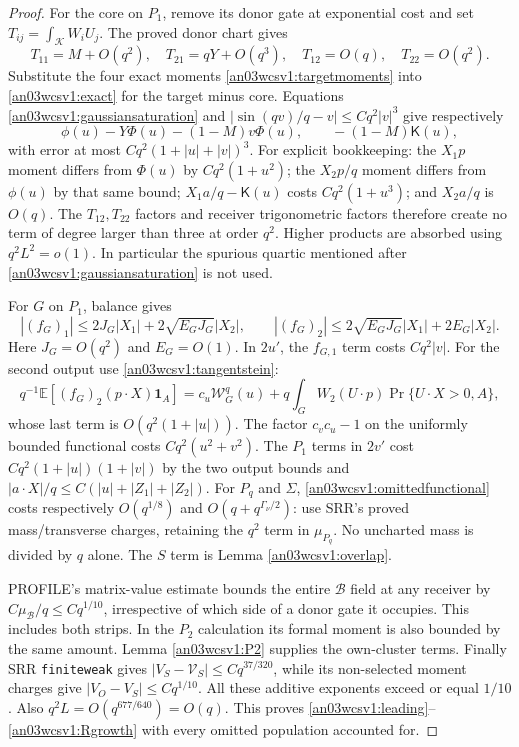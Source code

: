 \documentclass[11pt]{article}
\numberwithin{equation}{section}
\theoremstyle{remark}\newtheorem{remark}[theorem]{Remark}
\newcommand{\E}{\mathbb E}\newcommand{\dd}{\,d}\newcommand{\one}{\mathbf1}
\newcommand{\KK}{\mathcal K}\newcommand{\BB}{\mathcal B}
\newcommand{\Kfun}{\mathsf K}\newcommand{\Ffun}{\mathsf F}
\begin{document}
\begin{proof}
For the core on $P_1$, remove its donor gate at exponential cost
and set $T_{ij}=\int_\KK W_iU_j$. The proved donor chart gives
\[
 T_{11}=M+O(q^2),\quad T_{21}=qY+O(q^3),\quad
 T_{12}=O(q),\quad T_{22}=O(q^2).
\]
Substitute the four exact moments \eqref{an03wcsv1:targetmoments}
into \eqref{an03wcsv1:exact} for the target minus core.
Equations \eqref{an03wcsv1:gaussiansaturation} and
$|\sin(qv)/q-v|\le Cq^2|v|^3$ give respectively
\[
 \phi(u)-Y\Phi(u)-(1-M)v\Phi(u),\qquad
 -(1-M)\Kfun(u),
\]
with error at most $Cq^2(1+|u|+|v|)^3$.
For explicit bookkeeping: the $X_1p$ moment differs from $\Phi(u)$
by $Cq^2(1+u^2)$; the $X_2p/q$ moment differs from $\phi(u)$
by that same bound; $X_1a/q-\Kfun(u)$ costs $Cq^2(1+u^3)$;
and $X_2a/q$ is $O(q)$. The $T_{12},T_{22}$ factors and
receiver trigonometric factors therefore create no term of degree
larger than three at order $q^2$. Higher products are absorbed using
$q^2L^2=o(1)$. In particular the spurious quartic mentioned after
\eqref{an03wcsv1:gaussiansaturation} is not used.

For $G$ on $P_1$, balance gives
\[
 |(f_G)_1|\le2J_G|X_1|+2\sqrt{E_GJ_G}|X_2|,\qquad
 |(f_G)_2|\le2\sqrt{E_GJ_G}|X_1|+2E_G|X_2|.
\]
Here $J_G=O(q^2)$ and $E_G=O(1)$.
In $2u'$, the $f_{G,1}$ term costs $Cq^2|v|$.
For the second output use \eqref{an03wcsv1:tangentstein}:
\[
 q^{-1}\E[(f_G)_2(p\cdot X)\one_A]
 =c_u\mathcal W_G^q(u)
       +q\int_GW_2(U\cdot p)\Pr\{U\cdot X>0,A\},
\]
whose last term is $O(q^2(1+|u|))$.
The factor $c_vc_u-1$ on the uniformly bounded functional costs
$Cq^2(u^2+v^2)$. The $P_1$ terms in $2v'$ cost
$Cq^2(1+|u|)(1+|v|)$ by the two output bounds and
$|a\cdot X|/q\le C(|u|+|Z_1|+|Z_2|)$.
For $P_q$ and $\Sigma$, \eqref{an03wcsv1:omittedfunctional}
costs respectively $O(q^{1/8})$ and $O(q+q^{\Gamma_\nu/2})$:
use SRR's proved mass/transverse charges, retaining the $q^2$
term in $\mu_{P_q}$. No uncharted mass is divided by $q$ alone.
The $S$ term is Lemma \ref{an03wcsv1:overlap}.

PROFILE's matrix-value estimate bounds the entire $\BB$ field
at any receiver by $C\mu_\BB/q\le Cq^{1/10}$, irrespective of
which side of a donor gate it occupies. This includes both strips.
In the $P_2$ calculation its formal moment is also bounded by
the same amount.
Lemma \ref{an03wcsv1:P2} supplies the own-cluster terms.
Finally SRR \texttt{finiteweak} gives
$|V_S-\mathcal V_S|\le Cq^{37/320}$, while its non-selected
moment charges give $|V_O-V_S|\le Cq^{1/10}$.
All these additive exponents exceed or equal $1/10$.
Also $q^2L=O(q^{677/640})=O(q)$.
This proves \eqref{an03wcsv1:leading}--\eqref{an03wcsv1:Rgrowth}
with every omitted population accounted for.
\end{proof}
\end{document}
